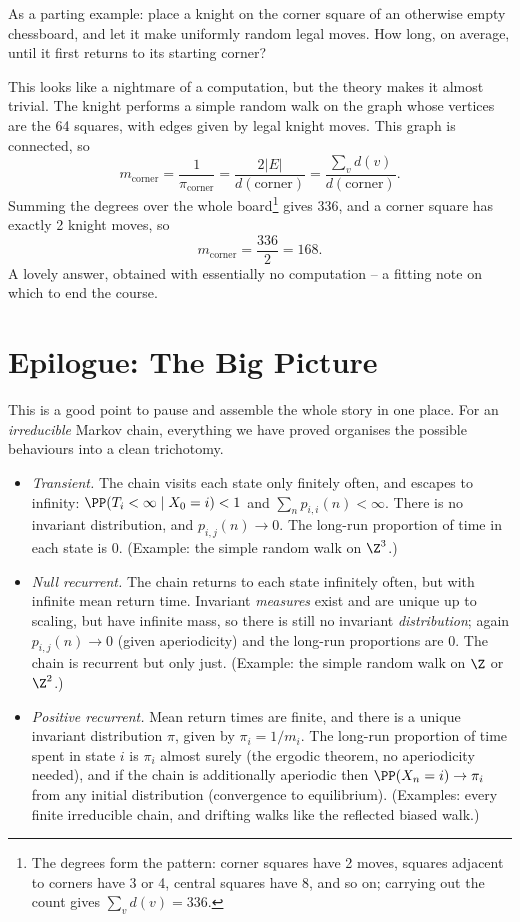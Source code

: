 \begin{example}
	As a parting example: place a knight on the corner square of an otherwise empty chessboard, and let it make uniformly random legal moves. How long, on average, until it first returns to its starting corner?

	This looks like a nightmare of a computation, but the theory makes it almost trivial. The knight performs a simple random walk on the graph whose vertices are the 64 squares, with edges given by legal knight moves. This graph is connected, so
	$$
	m_{\text{corner}} = \frac{1}{\pi_{\text{corner}}} = \frac{2|E|}{d(\text{corner})} = \frac{\sum_v d(v)}{d(\text{corner})}.
	$$
	Summing the degrees over the whole board\footnote{The degrees form the pattern: corner squares have 2 moves, squares adjacent to corners have 3 or 4, central squares have 8, and so on; carrying out the count gives $\sum_v d(v) = 336$.} gives $336$, and a corner square has exactly 2 knight moves, so
	$$
	m_{\text{corner}} = \frac{336}{2} = 168.
	$$
	A lovely answer, obtained with essentially no computation -- a fitting note on which to end the course.
\end{example}

\section*{Epilogue: The Big Picture}

This is a good point to pause and assemble the whole story in one place. For an \emph{irreducible} Markov chain, everything we have proved organises the possible behaviours into a clean trichotomy.

\begin{itemize}
	\item \emph{Transient.} The chain visits each state only finitely often, and escapes to infinity: $\PP(T_i < \infty \mid X_0 = i) < 1$ and $\sum_n p_{i,i}(n) < \infty$. There is no invariant distribution, and $p_{i, j}(n) \rightarrow 0$. The long-run proportion of time in each state is 0. (Example: the simple random walk on $\Z^3$.)
	\item \emph{Null recurrent.} The chain returns to each state infinitely often, but with infinite mean return time. Invariant \emph{measures} exist and are unique up to scaling, but have infinite mass, so there is still no invariant \emph{distribution}; again $p_{i, j}(n) \rightarrow 0$ (given aperiodicity) and the long-run proportions are 0. The chain is recurrent but only just. (Example: the simple random walk on $\Z$ or $\Z^2$.)
	\item \emph{Positive recurrent.} Mean return times are finite, and there is a unique invariant distribution $\pi$, given by $\pi_i = 1/m_i$. The long-run proportion of time spent in state $i$ is $\pi_i$ almost surely (the ergodic theorem, no aperiodicity needed), and if the chain is additionally aperiodic then $\PP(X_n = i) \rightarrow \pi_i$ from any initial distribution (convergence to equilibrium). (Examples: every finite irreducible chain, and drifting walks like the reflected biased walk.)
\end{itemize}


